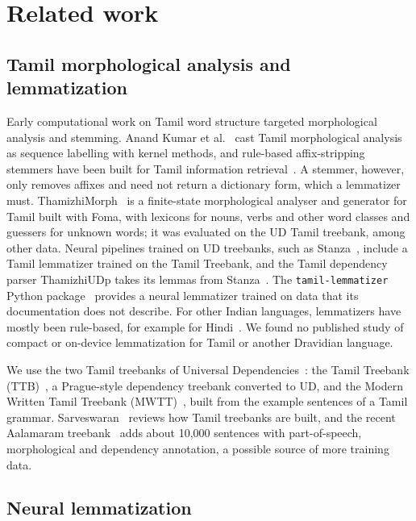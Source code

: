 \documentclass{sadhana}
\begin{document}
\section{Related work}
\label{sec:related}

\subsection{Tamil morphological analysis and lemmatization}

Early computational work on Tamil word structure targeted morphological
analysis and stemming. Anand Kumar et al.~\cite{anandkumar2010} cast Tamil
morphological analysis as sequence labelling with kernel methods, and rule-based
affix-stripping stemmers have been built for Tamil information
retrieval~\cite{thangarasu2013}. A stemmer, however, only removes affixes and
need not return a dictionary form, which a lemmatizer must. ThamizhiMorph~\cite{thamizhimorph}
is a finite-state morphological analyser and generator for Tamil built with
Foma, with lexicons for nouns, verbs and other word classes and guessers for
unknown words; it was evaluated on the UD Tamil treebank, among other data.
Neural pipelines trained on UD treebanks, such as Stanza~\cite{stanza},
include a Tamil lemmatizer trained on the Tamil Treebank, and the Tamil
dependency parser ThamizhiUDp takes its lemmas from Stanza~\cite{thamizhiudp}.
The \texttt{tamil-lemmatizer} Python package~\cite{tamillemmapkg} provides a
neural lemmatizer trained on data that its documentation does not describe.
For other Indian languages, lemmatizers have mostly been rule-based, for
example for Hindi~\cite{paul2013}. We found no published study of compact or
on-device lemmatization for Tamil or another Dravidian language.

We use the two Tamil treebanks of Universal Dependencies~\cite{nivre2020}: the
Tamil Treebank (TTB)~\cite{ttb}, a Prague-style dependency treebank converted
to UD, and the Modern Written Tamil Treebank (MWTT)~\cite{mwtt}, built from the
example sentences of a Tamil grammar. Sarveswaran~\cite{sarveswaran2024}
reviews how Tamil treebanks are built, and the recent Aalamaram
treebank~\cite{aalamaram} adds about 10,000 sentences with part-of-speech,
morphological and dependency annotation, a possible source of more training
data.

\subsection{Neural lemmatization}
\end{document}
